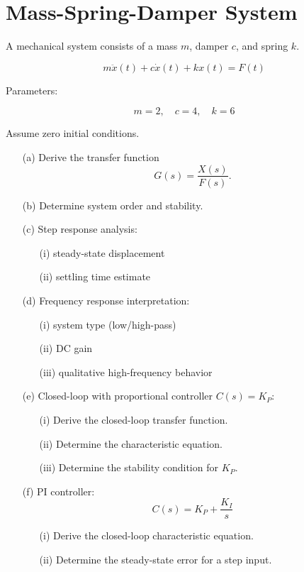 \documentclass[a4paper,12pt]{article}
\begin{document}
\fi


\section{Mass-Spring-Damper System}

A mechanical system consists of a mass $m$, damper $c$, and spring $k$.

\[
m\ddot{x}(t) + c\dot{x}(t) + kx(t) = F(t)
\]

Parameters:

\[
m=2,\quad c=4,\quad k=6
\]

Assume zero initial conditions.

\begin{enumerate}

\item[(a)] Derive the transfer function
\[
G(s)=\frac{X(s)}{F(s)}.
\]

\item[(b)] Determine system order and stability.

\item[(c)] Step response analysis:
\begin{enumerate}
\item[(i)] steady-state displacement
\item[(ii)] settling time estimate
\end{enumerate}

\item[(d)] Frequency response interpretation:
\begin{enumerate}
\item[(i)] system type (low/high-pass)
\item[(ii)] DC gain
\item[(iii)] qualitative high-frequency behavior
\end{enumerate}

\item[(e)] Closed-loop with proportional controller $C(s)=K_P$:
\begin{enumerate}
\item[(i)] Derive the closed-loop transfer function.
\item[(ii)] Determine the characteristic equation.
\item[(iii)] Determine the stability condition for $K_P$.
\end{enumerate}

\item[(f)] PI controller:
\[
C(s)=K_P+\frac{K_I}{s}
\]

\begin{enumerate}
\item[(i)] Derive the closed-loop characteristic equation.
\item[(ii)] Determine the steady-state error for a step input.
\end{enumerate}

\end{enumerate}
\end{document}
